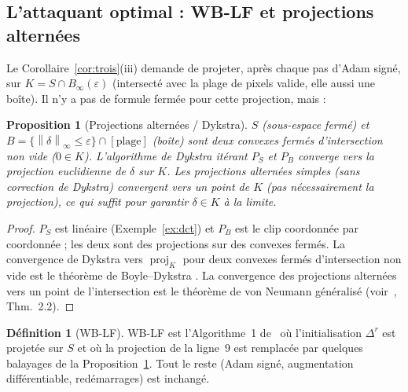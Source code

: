 \documentclass[11pt,a4paper]{article}
\theoremstyle{plain}
\newtheorem{proposition}[theorem]{Proposition}
\theoremstyle{definition}
\newtheorem{definition}[theorem]{Définition}
\theoremstyle{remark}
\newcommand{\norm}[1]{\left\lVert #1 \right\rVert}
\begin{document}
\subsection{L'attaquant optimal : WB-LF et projections alternées}

Le Corollaire~\ref{cor:trois}(iii) demande de projeter, après chaque pas d'Adam signé, sur
$K=S\cap B_\infty(\varepsilon)$ (intersecté avec la plage de pixels valide, elle aussi une boîte).
Il n'y a pas de formule fermée pour cette projection, mais :

\begin{proposition}[Projections alternées / Dykstra]\label{prop:dykstra}
$S$ (sous-espace fermé) et $B=\{\norm\delta_\infty\le\varepsilon\}\cap[\text{plage}]$ (boîte) sont
deux convexes fermés d'intersection non vide ($0\in K$). L'algorithme de Dykstra
\cite{boyle1986,bauschke1996} itérant $P_S$ et $P_B$ converge vers la projection euclidienne de
$\delta$ sur $K$. Les projections alternées simples (sans correction de Dykstra) convergent vers
un point de $K$ (pas nécessairement la projection), ce qui suffit pour garantir
$\delta\in K$ à la limite.
\end{proposition}
\begin{proof}
$P_S$ est linéaire (Exemple~\ref{ex:dct}) et $P_B$ est le clip coordonnée par coordonnée ; les deux
sont des projections sur des convexes fermés. La convergence de Dykstra vers $\operatorname{proj}_K$
pour deux convexes fermés d'intersection non vide est le théorème de Boyle--Dykstra
\cite{boyle1986}. La convergence des projections alternées vers un point de l'intersection est
le théorème de von Neumann généralisé (voir~\cite{bauschke1996}, Thm.~2.2).
\end{proof}

\begin{definition}[WB-LF]
WB-LF est l'Algorithme~1 de~\cite{geiping2021} où l'initialisation $\Delta^r$ est projetée sur $S$
et où la projection de la ligne~9 est remplacée par quelques balayages de la
Proposition~\ref{prop:dykstra}. Tout le reste (Adam signé, augmentation différentiable, redémarrages)
est inchangé.
\end{definition}
\end{document}
